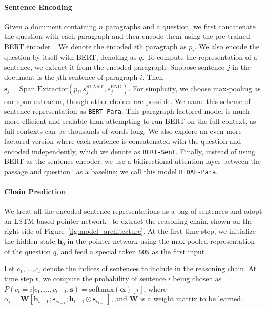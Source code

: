 \documentclass[11pt,a4paper]{article}
\begin{document}
\paragraph{Sentence Encoding}
Given a document containing $n$ paragraphs and a question, we first concatenate the question with each paragraph and then encode them using the pre-trained BERT encoder~\citep{devlin2018bert}. We denote the encoded $i$th paragraph as $p_i$. We also encode the question by itself with BERT, denoting as $q$. To compute the representation of a sentence, we extract it from the encoded paragraph. Suppose sentence $j$ in the document is the $j$th sentence of paragraph $i$. Then $\mathbf{s}_j = \text{Span\_Extractor}(p_i, s^{\text{START}}_j, s^{\text{END}}_j )$. For simplicity, we choose max-pooling as our span extractor, though other choices are possible. We name this scheme of sentence representation as \texttt{BERT-Para}. This paragraph-factored model is much more efficient and scalable than attempting to run BERT on the full context, as full contexts can be thousands of words long. We also explore an even more factored version where each sentence is concatenated with the question and encoded independently, which we denote as \texttt{BERT-Sent}. Finally, instead of using BERT as the sentence encoder, we use a bidirectional attention layer between the passage and question~\citep{seo2016bidirectional} as a baseline; we call this model \texttt{BiDAF-Para}.

\paragraph{Chain Prediction}
We treat all the encoded sentence representations as a bag of sentences and adopt an LSTM-based pointer network~\citep{vinyals2015pointer} to extract the reasoning chain, shown on the right side of Figure~\ref{fig:model_architecture}. At the first time step, we initialize the hidden state $\mathbf{h}_0$ in the pointer network using the max-pooled representation of the question $q$, and feed a special token \texttt{SOS} as the first input.

Let $c_1,\ldots,c_l$ denote the indices of sentences to include in the reasoning chain. At time step $t$, we compute the probability of sentence $i$ being chosen as $P(c_t=i|c_1,\ldots,c_{t-1},\mathbf{s}) = \textrm{softmax}(\mathbf{\alpha})[i]$, where $\alpha_i = \mathbf{W} [\mathbf{h}_{t-1}; \mathbf{s}_{c_{t-1}}; \mathbf{h}_{t-1}\odot \mathbf{s}_{c_{t-1}}]$, and $\mathbf{W}$ is a weight matrix to be learned.
\end{document}
